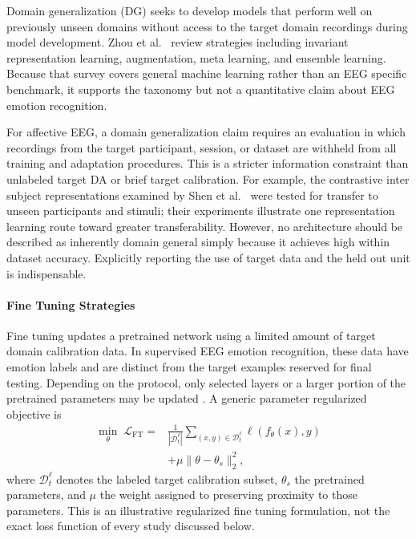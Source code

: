 \documentclass[ASNA,twocolumn]{USG}
\begin{document}
Domain generalization (DG) seeks to develop models that perform well on previously unseen domains without access to the target domain recordings during model development. Zhou et al.~\cite{zhou2022domain} review strategies including invariant representation learning, augmentation, meta learning, and ensemble learning. Because that survey covers general machine learning rather than an EEG specific benchmark, it supports the taxonomy but not a quantitative claim about EEG emotion recognition.

For affective EEG, a domain generalization claim requires an evaluation in which recordings from the target participant, session, or dataset are withheld from all training and adaptation procedures. This is a stricter information constraint than unlabeled target DA or brief target calibration. For example, the contrastive inter subject representations examined by Shen et al.~\cite{shen2022contrastive} were tested for transfer to unseen participants and stimuli; their experiments illustrate one representation learning route toward greater transferability. However, no architecture should be described as inherently domain general simply because it achieves high within dataset accuracy. Explicitly reporting the use of target data and the held out unit is indispensable.

\paragraph{Fine Tuning Strategies}

Fine tuning updates a pretrained network using a limited amount of target domain calibration data. In supervised EEG emotion recognition, these data have emotion labels and are distinct from the target examples reserved for final testing. Depending on the protocol, only selected layers or a larger portion of the pretrained parameters may be updated \cite{wu2020transfer,wan2021review}. A generic parameter regularized objective is
\begin{equation}
\begin{aligned}
\min_{\theta}\;\mathcal{L}_{\mathrm{FT}}
={}&\frac{1}{|\mathcal{D}_{t}^{\ell}|}
\sum_{(x,y)\in\mathcal{D}_{t}^{\ell}}
\ell\!\left(f_{\theta}(x),y\right)\\
&+\mu\|\theta-\theta_s\|_{2}^{2},
\end{aligned}
\label{eq:ft_subjectind}
\end{equation}
where $\mathcal{D}_{t}^{\ell}$ denotes the labeled target calibration subset, $\theta_s$ the pretrained parameters, and $\mu$ the weight assigned to preserving proximity to those parameters. This is an illustrative regularized fine tuning formulation, not the exact loss function of every study discussed below.
\end{document}
